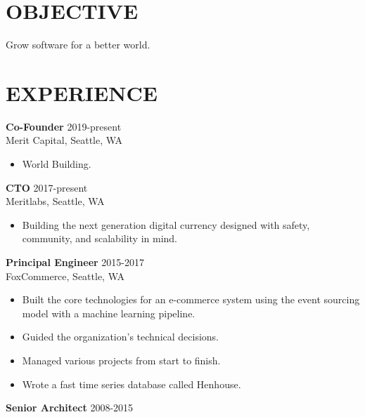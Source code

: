 \documentclass[line,margin]{res}
\begin{document}
\address{{\bf www.mempko.com}}
\address{{\bf max@mempko.com}}

\begin{resume}
 
\section{OBJECTIVE}       
                Grow software for a better world.
 
\section{EXPERIENCE} 
                {\bf Co-Founder} \hfill 2019-present \\
                Merit Capital, 
                Seattle, WA
                 \begin{itemize}  \itemsep -1pt %
                    \item World Building.
                 \end{itemize}
                {\bf CTO} \hfill 2017-present \\
                Meritlabs, 
                Seattle, WA
                 \begin{itemize}  \itemsep -1pt %
                    \item Building the next generation digital currency designed
                        with safety, community, and scalability in mind.
                 \end{itemize}
                {\bf Principal Engineer} \hfill 2015-2017 \\
                FoxCommerce, 
                Seattle, WA
                 \begin{itemize}  \itemsep -1pt %
                    \item Built the core technologies for an e-commerce system 
                        using the event sourcing model with a machine learning pipeline.
                    \item Guided the organization's technical decisions.
                    \item Managed various projects from start to finish.
                    \item Wrote a fast time series database called Henhouse.
                 \end{itemize}
                {\bf Senior Architect} \hfill 2008-2015 \\

\end{resume}
\end{document}
